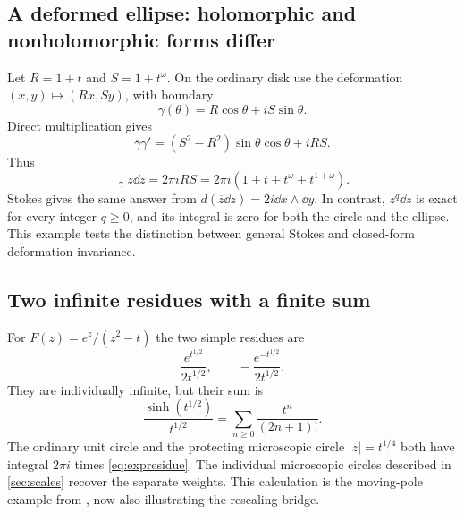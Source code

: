 \documentclass[11pt,letterpaper]{article}
\theoremstyle{definition}
\theoremstyle{remark}
\newcommand{\HCoint}{\mathop{\oint^{\!H}}\nolimits}
\numberwithin{equation}{section}
\begin{document}
\subsection{A deformed ellipse: holomorphic and nonholomorphic forms differ}
Let $R=1+t$ and $S=1+t^\omega$. On the ordinary disk use the deformation $(x,y)\mapsto(Rx,Sy)$, with boundary
\[
 \gamma(\theta)=R\cos\theta+iS\sin\theta.
\]
Direct multiplication gives
\[
 \overline\gamma\gamma'
 =(S^2-R^2)\sin\theta\cos\theta+iRS.
\]
Thus
\begin{equation}\label{eq:ellipse}
 \HCoint_\gamma\overline z\dd z=2\pi i RS
 =2\pi i(1+t+t^\omega+t^{1+\omega}).
\end{equation}
Stokes gives the same answer from $d(\overline z\dd z)=2i\dd x\wedge\dd y$. In contrast, $z^q\dd z$ is exact for every integer $q\ge0$, and its integral is zero for both the circle and the ellipse. This example tests the distinction between general Stokes and closed-form deformation invariance.

\subsection{Two infinite residues with a finite sum}
For $F(z)=e^z/(z^2-t)$ the two simple residues are
\[
 \frac{e^{t^{1/2}}}{2t^{1/2}},\qquad
 -\frac{e^{-t^{1/2}}}{2t^{1/2}}.
\]
They are individually infinite, but their sum is
\begin{equation}\label{eq:expresidue}
 \frac{\sinh(t^{1/2})}{t^{1/2}}
 =\sum_{n\ge0}\frac{t^n}{(2n+1)!}.
\end{equation}
The ordinary unit circle and the protecting microscopic circle $|z|=t^{1/4}$ both have integral $2\pi i$ times \eqref{eq:expresidue}. The individual microscopic circles described in \cref{sec:scales} recover the separate weights. This calculation is the moving-pole example from \cite{Analysis}, now also illustrating the rescaling bridge.
\end{document}
